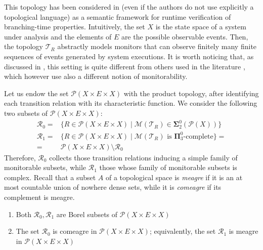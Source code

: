 \documentclass{lmcs}
\newcommand{\bsigma}{\boldsymbol\Sigma}
\newcommand{\bpi}{\boldsymbol\Pi}
\begin{document}
\begin{rem}
This topology has been considered in \cite{CicconeDF25} (even if the authors do not use explicitly a topological language) 
 as a semantic framework for runtime verification of branching-time properties.
Intuitively, the set $X$ is the state space of a system under analysis and the elements of $E$ are the possible observable events. 
Then, the topology $\mathcal T_R$ abstractly models monitors that can observe finitely many finite sequences of events generated by system executions. 
It is worth noticing that, as discussed in \cite{CicconeDF25}, this setting is quite different from others used in the literature \cite{FrancalanzaAI17}, which however use also a different notion of monitorability. 
\end{rem}

Let us endow the set $\mathcal{P}(X\times E \times X)$ with the product topology, after identifying each transition relation with its characteristic function. 
We consider the following two subsets of $\mathcal{P}(X\times E \times X)$: 
\begin{align*}
\mathcal R_0= & \{ R\in \mathcal P (X\times E\times X)\mid \mathcal M ( \mathcal T_R)\in \bsigma^0_2( \mathcal P (X))\} \\
\mathcal R_1= & \{ R\in \mathcal P (X\times E\times X)\mid \mathcal M ( \mathcal T_R) \text{ is } \bpi^0_3 \text{-complete} \} = \\
= & \mathcal P (X\times E\times X)\setminus \mathcal R_0
\end{align*}
Therefore, $\mathcal R_0$ collects those transition relations inducing a simple family of monitorable subsets, while $\mathcal R_1$ those whose family of monitorable subsets is complex. 
% 
Recall that a subset $A$ of a topological space is \emph{meagre} if it is an at most countable union of nowhere dense sets, while it is \emph{comeagre} if its complement is meagre.

\begin{thm} \label{thm:trn}
\begin{enumerate}
\item\label{thm:trn:1} Both $ \mathcal R_0, \mathcal R_1$ are Borel subsets of $ \mathcal P (X\times E\times X)$
\item\label{thm:trn:2} The set $ \mathcal R_0$ is comeagre in $ \mathcal P (X\times E\times X)$; equivalently, the set $ \mathcal R_1$ is meagre in $ \mathcal P (X\times E\times X)$
\end{enumerate}
\end{thm}
\end{document}
